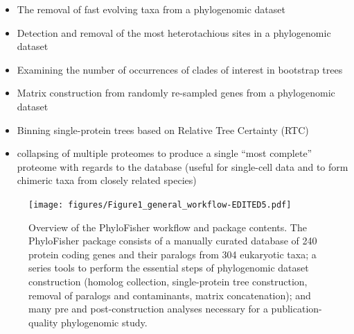 \documentclass{article}
\begin{document}
\begin{itemize}
\begin{itemize}
                    \item The removal of fast evolving taxa from a phylogenomic dataset
                    \item Detection and removal of the most heterotachious sites in a phylogenomic dataset
                    \item Examining the number of occurrences of clades  of interest in bootstrap trees
                    \item Matrix construction from randomly re-sampled genes from a phylogenomic dataset
                    \item Binning single-protein trees based on Relative Tree Certainty (RTC)
                    \item collapsing of multiple proteomes to produce a single “most complete” proteome with regards to the database (useful for  single-cell data and to form chimeric taxa from closely related species)
                \end{itemize}
        \end{itemize}

        \begin{figure}[H]
            \centering
        	 \texttt{[image: figures/Figure1\_general\_workflow-EDITED5.pdf]}
        	  \caption{Overview of the PhyloFisher workflow and package contents. The PhyloFisher package consists of a manually curated database of 240 protein coding genes and their paralogs from 304 eukaryotic taxa; a series tools to perform the essential steps of phylogenomic dataset construction (homolog collection, single-protein tree construction, removal of paralogs and contaminants, matrix concatenation); and many pre and post-construction analyses necessary for a publication-quality phylogenomic study.}
        	  \label{Fig:workflow}
        \end{figure}
        
\end{document}
